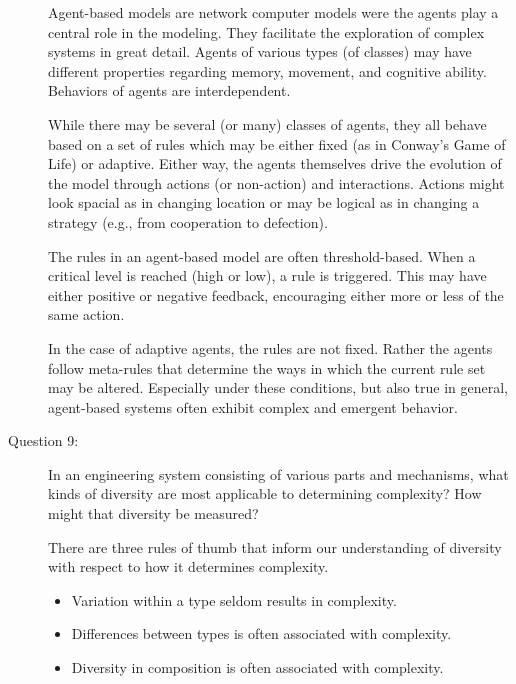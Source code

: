 \documentclass[letterpaper,10pt]{article}
\begin{document}
\begin{description}
Agent-based models are network computer models  were the agents play a central role in the modeling. They facilitate the exploration of complex systems in great detail.  Agents of various types (of classes) may have different properties regarding memory, movement, and cognitive ability.  Behaviors of agents are interdependent.

While there may be several (or many) classes of agents, they all behave based on a set of rules which may be either fixed (as in Conway's Game of Life) or adaptive.  Either way, the agents themselves drive the evolution of the model through actions (or non-action) and interactions.  Actions might look spacial as in changing location or may be logical as in changing a strategy (e.g., from cooperation to defection).

The rules in an agent-based model are often threshold-based.  When a critical level is reached (high or low), a rule is triggered.  This may have either positive or negative feedback, encouraging either more or less of the same action.

In the case of adaptive agents, the rules are not fixed.  Rather the agents follow meta-rules that determine the ways in which the current rule set may be altered.  Especially under these conditions, but also true in general, agent-based systems often exhibit complex and emergent behavior.

\item[Question 9:]
In an engineering system consisting of various parts and mechanisms, what kinds of diversity are most applicable to determining complexity?  How might that diversity be measured?

There are three rules of thumb that inform our understanding of diversity with respect to how it determines complexity.
\begin{itemize}
  \item Variation within a type seldom results in complexity.
  \item Differences between types is often associated with complexity.
  \item Diversity in composition is often associated with complexity.
\end{itemize}


\end{description}
\end{document}
